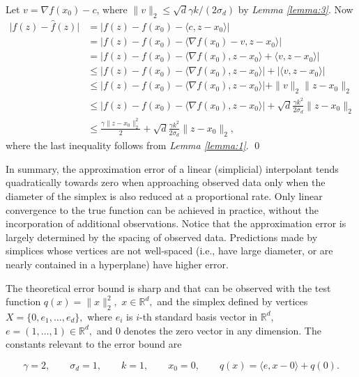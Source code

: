 \documentclass[smallextended,final]{svjour3}  %
\begin{document}
\begin{proofdot}
  Let $v = \nabla f(x_0) - c$, where $\|v\|_2 \leq \sqrt{d} \gamma k / (2 \sigma_d)$ by {\it Lemma \ref{lemma:3}}. Now
  \begin{align*}
    \big|f(z) - \hat f(z)\big|
       &= \big|f(z) - f(x_0) - \langle c, z - x_0 \rangle \big| \\ 
       &= \big|f(z) - f(x_0) - \langle \nabla f(x_0) - v, z - x_0 \rangle \big| \\
       &= \big|f(z) - f(x_0) - \langle \nabla f(x_0) , z - x_0 \rangle + \langle v , z - x_0 \rangle \big| \\
       &\leq \big|f(z) - f(x_0) - \langle \nabla f(x_0) , z - x_0 \rangle \big| + \big| \langle v , z - x_0 \rangle \big| \\
       &\leq \big|f(z) - f(x_0) - \langle \nabla f(x_0) , z - x_0 \rangle \big| + \|v\|_2 \|z - x_0\|_2 \\
       &\leq \big|f(z) - f(x_0) - \langle \nabla f(x_0), z - x_0 \rangle \big| + \textstyle{\sqrt{d}\frac{\gamma k^2}{2 \sigma_d}} \|z - x_0\|_2 \\
       &\leq \frac{\gamma \|z - x_0\|_2^2}{2} + \sqrt{d}\frac{\gamma k^2}{2 \sigma_d} \|z - x_0\|_2,
  \end{align*}
  where the last inequality follows from {\it Lemma \ref{lemma:1}}.
  \qed
\end{proofdot}


In summary, the approximation error of a linear (simplicial)
interpolant tends quadratically towards zero when approaching observed
data only when the diameter of the simplex is also reduced at a
proportional rate.  Only linear convergence to the true function can
be achieved in practice, without the incorporation of additional
observations. Notice that the approximation error is largely
determined by the spacing of observed data. Predictions made by
simplices whose vertices are not well-spaced (i.e., have large
diameter, or are nearly contained in a hyperplane) have higher
error.

The theoretical error bound is sharp and that can be observed with the
test function $q(x) = \|x\|_2^2,$ $x \in \mathbb{R}^d,$ and the
simplex defined by vertices $X = \{0, e_1, \ldots, e_d\},$ where $e_i$
is $i$-th standard basis vector in $\mathbb{R}^d,$ $e = (1,\ldots,1)
\in \mathbb{R}^d,$ and $0$ denotes the zero vector in any dimension.
The constants relevant to the error bound are

\vspace{-2mm}
$$ \gamma = 2, \qquad \sigma_d = 1, \qquad k = 1, \qquad x_0 = 0,
\qquad \hat q(x) = \langle e, x - 0\rangle + q(0). $$
\vspace{-2mm}
\end{document}
